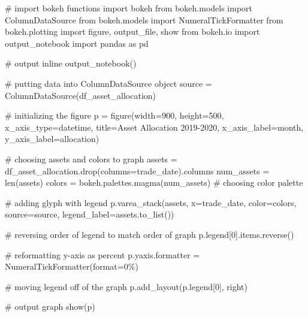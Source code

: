 \documentclass[
  letterpaper,
  DIV=11,
  numbers=noendperiod]{scrreprt}
\newenvironment{Shaded}{\begin{snugshade}}{\end{snugshade}}
\newcommand{\BuiltInTok}[1]{\textcolor[rgb]{0.00,0.23,0.31}{#1}}
\newcommand{\CommentTok}[1]{\textcolor[rgb]{0.37,0.37,0.37}{#1}}
\newcommand{\DecValTok}[1]{\textcolor[rgb]{0.68,0.00,0.00}{#1}}
\newcommand{\ImportTok}[1]{\textcolor[rgb]{0.00,0.46,0.62}{#1}}
\newcommand{\NormalTok}[1]{\textcolor[rgb]{0.00,0.23,0.31}{#1}}
\newcommand{\OperatorTok}[1]{\textcolor[rgb]{0.37,0.37,0.37}{#1}}
\newcommand{\StringTok}[1]{\textcolor[rgb]{0.13,0.47,0.30}{#1}}
\begin{document}
\begin{Shaded}
\begin{Highlighting}[]
\CommentTok{\# import bokeh functions}
\ImportTok{import}\NormalTok{ bokeh}
\ImportTok{from}\NormalTok{ bokeh.models }\ImportTok{import}\NormalTok{ ColumnDataSource}
\ImportTok{from}\NormalTok{ bokeh.models }\ImportTok{import}\NormalTok{ NumeralTickFormatter}
\ImportTok{from}\NormalTok{ bokeh.plotting }\ImportTok{import}\NormalTok{ figure, output\_file, show}
\ImportTok{from}\NormalTok{ bokeh.io }\ImportTok{import}\NormalTok{ output\_notebook}
\ImportTok{import}\NormalTok{ pandas }\ImportTok{as}\NormalTok{ pd}

\CommentTok{\# output inline}
\NormalTok{output\_notebook()}

\CommentTok{\# putting data into ColumnDataSource object}
\NormalTok{source }\OperatorTok{=}\NormalTok{ ColumnDataSource(df\_asset\_allocation)}

\CommentTok{\# initializing the figure}
\NormalTok{p }\OperatorTok{=}\NormalTok{ figure(width}\OperatorTok{=}\DecValTok{900}\NormalTok{, height}\OperatorTok{=}\DecValTok{500}\NormalTok{, x\_axis\_type}\OperatorTok{=}\StringTok{\textquotesingle{}datetime\textquotesingle{}}\NormalTok{, title}\OperatorTok{=}\StringTok{\textquotesingle{}Asset Allocation 2019{-}2020\textquotesingle{}}\NormalTok{,}
\NormalTok{           x\_axis\_label}\OperatorTok{=}\StringTok{\textquotesingle{}month\textquotesingle{}}\NormalTok{, y\_axis\_label}\OperatorTok{=}\StringTok{\textquotesingle{}allocation\textquotesingle{}}\NormalTok{)}

\CommentTok{\# choosing assets and colors to graph}
\NormalTok{assets }\OperatorTok{=}\NormalTok{ df\_asset\_allocation.drop(columns}\OperatorTok{=}\StringTok{\textquotesingle{}trade\_date\textquotesingle{}}\NormalTok{).columns}
\NormalTok{num\_assets }\OperatorTok{=} \BuiltInTok{len}\NormalTok{(assets)}
\NormalTok{colors }\OperatorTok{=}\NormalTok{ bokeh.palettes.magma(num\_assets) }\CommentTok{\# choosing color palette}

\CommentTok{\# adding glyph with legend}
\NormalTok{p.varea\_stack(assets, x}\OperatorTok{=}\StringTok{\textquotesingle{}trade\_date\textquotesingle{}}\NormalTok{, color}\OperatorTok{=}\NormalTok{colors, source}\OperatorTok{=}\NormalTok{source, legend\_label}\OperatorTok{=}\NormalTok{assets.to\_list())}

\CommentTok{\# reversing order of legend to match order of graph}
\NormalTok{p.legend[}\DecValTok{0}\NormalTok{].items.reverse()}

\CommentTok{\# reformatting y{-}axis as percent }
\NormalTok{p.yaxis.formatter }\OperatorTok{=}\NormalTok{ NumeralTickFormatter(}\BuiltInTok{format}\OperatorTok{=}\StringTok{\textquotesingle{}0\%\textquotesingle{}}\NormalTok{)}

\CommentTok{\# moving legend off of the graph}
\NormalTok{p.add\_layout(p.legend[}\DecValTok{0}\NormalTok{], }\StringTok{\textquotesingle{}right\textquotesingle{}}\NormalTok{)}

\CommentTok{\# output graph}
\NormalTok{show(p)}
\end{Highlighting}
\end{Shaded}
\end{document}
